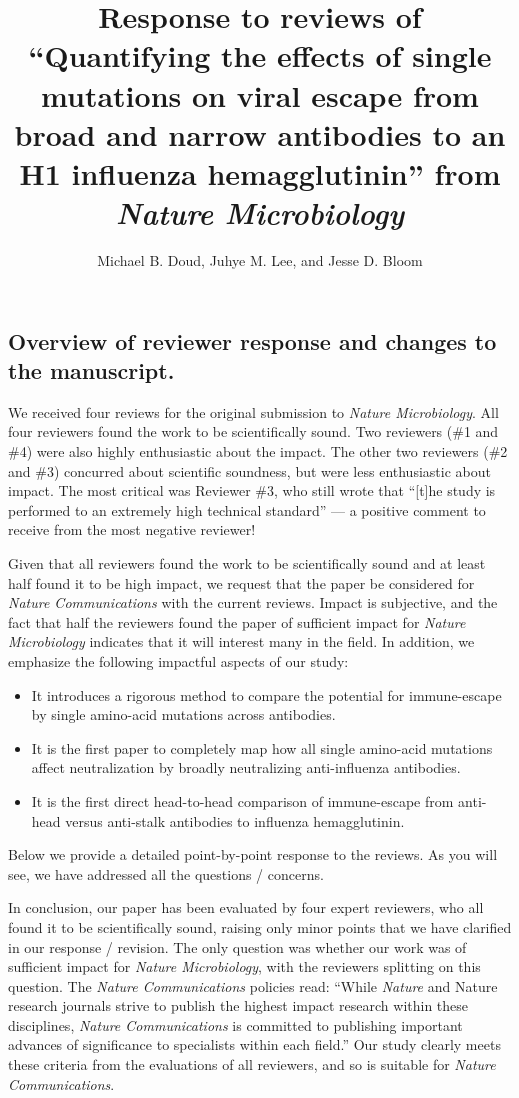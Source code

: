 \documentclass[11pt, oneside]{article}   	%
\title{Response to reviews of ``Quantifying the effects of single mutations on viral escape from broad and narrow antibodies to an H1 influenza hemagglutinin'' from \textit{Nature Microbiology}}
\author{Michael B. Doud, Juhye M. Lee, and Jesse D. Bloom}
\begin{document}
\maketitle

\subsection*{Overview of reviewer response and changes to the manuscript.}

We received four reviews for the original submission to \textit{Nature Microbiology}.
All four reviewers found the work to be scientifically sound.
Two reviewers (\#1 and \#4) were also highly enthusiastic about the impact.
The other two reviewers (\#2 and \#3) concurred about scientific soundness, but were less enthusiastic about impact.
The most critical was Reviewer \#3, who still wrote that ``[t]he study is performed to an extremely high technical standard'' --- a positive comment to receive from the most negative reviewer!

Given that all reviewers found the work to be scientifically sound and at least half found it to be high impact, we request that the paper be considered for \textit{Nature Communications} with the current reviews.
Impact is subjective, and the fact that half the reviewers found the paper of sufficient impact for \textit{Nature Microbiology} indicates that it will interest many in the field. 
In addition, we emphasize the following impactful aspects of our study:
\begin{itemize}\parskip1pt
\item It introduces a rigorous method to compare the potential for immune-escape by single amino-acid mutations across antibodies.
\item It is the first paper to completely map how all single amino-acid mutations affect neutralization by broadly neutralizing anti-influenza antibodies.
\item It is the first direct head-to-head comparison of immune-escape from anti-head versus anti-stalk antibodies to influenza hemagglutinin.
\end{itemize}

Below we provide a detailed point-by-point response to the reviews.
As you will see, we have addressed all the questions / concerns.

In conclusion, our paper has been evaluated by four expert reviewers, who all found it to be scientifically sound, raising only minor points that we have clarified in our response / revision.
The only question was whether our work was of sufficient impact for \textit{Nature Microbiology}, with the reviewers splitting on this question.
The \textit{Nature Communications} policies read: ``While \textit{Nature} and Nature research journals strive to publish the highest impact research within these disciplines, \textit{Nature Communications} is committed to publishing important advances of significance to specialists within each field.''
Our study clearly meets these criteria from the evaluations of all reviewers, and so is suitable for \textit{Nature Communications}.
\end{document}
